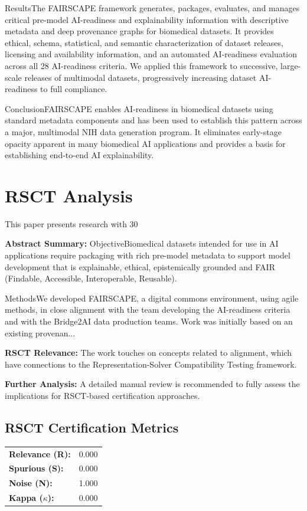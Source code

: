 \documentclass[11pt,a4paper]{article}
\begin{document}
ResultsThe FAIRSCAPE framework generates, packages, evaluates, and manages critical pre-model AI-readiness and explainability information with descriptive metadata and deep provenance graphs for biomedical datasets. It provides ethical, schema, statistical, and semantic characterization of dataset releases, licensing and availability information, and an automated AI-readiness evaluation across all 28 AI-readiness criteria. We applied this framework to successive, large-scale releases of multimodal datasets, progressively increasing dataset AI-readiness to full compliance.

ConclusionFAIRSCAPE enables AI-readiness in biomedical datasets using standard metadata components and has been used to establish this pattern across a major, multimodal NIH data generation program. It eliminates early-stage opacity apparent in many biomedical AI applications and provides a basis for establishing end-to-end AI explainability.

\section{RSCT Analysis}
This paper presents research with 30%

\textbf{Abstract Summary:} ObjectiveBiomedical datasets intended for use in AI applications require packaging with rich pre-model metadata to support model development that is explainable, ethical, epistemically grounded and FAIR (Findable, Accessible, Interoperable, Reusable).

MethodsWe developed FAIRSCAPE, a digital commons environment, using agile methods, in close alignment with the team developing the AI-readiness criteria and with the Bridge2AI data production teams. Work was initially based on an existing provenan...

\textbf{RSCT Relevance:} The work touches on concepts related to alignment, which have connections to the Representation-Solver Compatibility Testing framework.

\textbf{Further Analysis:} A detailed manual review is recommended to fully assess the implications for RSCT-based certification approaches.


\subsection*{RSCT Certification Metrics}
\begin{tabular}{ll}
\textbf{Relevance (R):} & 0.000 \\
\textbf{Spurious (S):} & 0.000 \\
\textbf{Noise (N):} & 1.000 \\
\textbf{Kappa ($\kappa$):} & 0.000 \\
\end{tabular}
\end{document}
